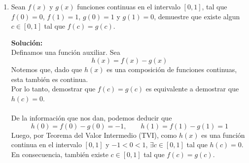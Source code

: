 \documentclass[12pt]{article}
\newenvironment{solucion}
{\begin{mdframed}[backgroundcolor=black!10]
		{\bf Solución:}\\
	}
	{
	\end{mdframed}
}
\newenvironment{preguntas}
{\begin{enumerate}\itemsep12pt
	}
	{
	\end{enumerate}
}
\newcommand{\ra}{\rightarrow}
\begin{document}
\begin{preguntas}
\begin{solucion}
Para $x \neq 2$ y $x \neq 3$, la función es continua, ya que corresponde a una composición de funciones continuas.\\
\\
Para $x=2$, los límites laterales deben coincidir, por lo que
$$\lim\limits_{x \ra 2} 3x-2 = \lim\limits_{x \ra 2} ax + b$$
$$4 = 2a + b$$
De manera análoga, en $x=3$,
$$\lim\limits_{x \ra 3} ax + b = \lim\limits_{x \ra 3} 2b - 3ax$$
$$3a + b = 2b - 9a \ra 12a - b = 0$$
Resolviendo el sistema de ecuaciones
$$
\begin{array}{rcrr}
2a+b & = & 4& \vline\\
12a-b & = & 0& \vline\\
\hline
\end{array}
$$
Obtenemos
$$a = \dfrac{2}{7}, \qquad b = \dfrac{24}{7}$$
\end{solucion}
\item Sean $f(x)$ y $g(x)$ funciones continuas en el intervalo $[0, 1]$, tal que $f(0)=0$, $f(1)=1$, $g(0)=1$ y $g(1)=0$, demuestre que existe algun $c \in [0,1]$ tal que $f(c) = g(c)$.
\begin{solucion}
Definamos una función auxiliar. Sea
$$h(x) = f(x) - g(x)$$
Notemos que, dado que $h(x)$ es una composición de funciones continuas, esta también es continua.\\
Por lo tanto, demostrar que $f(c) = g(c)$ es equivalente a demostrar que $h(c)=0$.\\
\\
De la información que nos dan, podemos deducir que
$$h(0) = f(0) - g(0) = -1, \qquad h(1) = f(1) - g(1) = 1$$
Luego, por Teorema del Valor Intermedio (TVI), como $h(x)$ es una función continua en el intervalo $[0,1]$ y $-1 < 0 < 1$, $\exists c \in [0, 1]$ tal que $h(c) = 0$. En consecuencia, también existe $c \in [0, 1]$ tal que $f(c) = g(c)$.
\end{solucion}
\end{preguntas}
\end{document}
